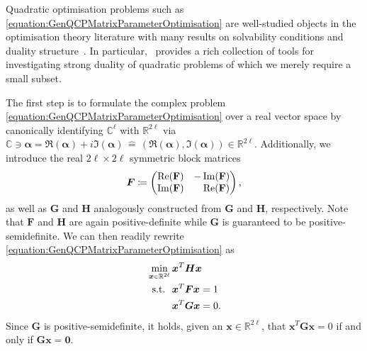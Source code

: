 \documentclass[10pt,conference]{IEEEtran}
\newcommand*{\R}{\mathbb{R}}          %
\newcommand*{\C}{\mathbb{C}}          %
\newcommand*{\transpose}{T}           %
\newcommand*{\deepscriptin}{\raisebox{0.1ex}{$\scriptscriptstyle \in$}}
\newcommand*{\mathhphantomdisplay}[2]{\mathmakebox[\widthof{$\displaystyle #1$}][l]{#2}}
\begin{document}
Quadratic optimisation problems such as \eqref{equation:GenQCPMatrixParameterOptimisation} are well-studied objects in the optimisation theory literature with many results on solvability conditions and duality structure~\cite{Thoai2000DualityBoundMethodForTheGeneralQuadraticProgrammingProblemWithQuadraticConstraints}.
In particular,~\cite{Nguyen2022StrongDualityForGeneralQuadraticProgramsWithQuadraticEqualityConstraints} provides a rich collection of tools for investigating strong duality of quadratic problems of which we merely require a small subset.

The first step is to formulate the complex problem \eqref{equation:GenQCPMatrixParameterOptimisation} over a real vector space by canonically identifying $\C^{\ell}$ with $\R^{2 \ell}$ via $\C \ni \bm{\alpha} = \Re(\bm{\alpha}) + i \Im(\bm{\alpha})\, \widehat{=}\, (\Re(\bm{\alpha}), \Im(\bm{\alpha})) \in \R^{2 \ell}$.
Additionally, we introduce the real $2 \ell \times 2 \ell$ symmetric block matrices
\begin{align}\label{equation:RealSymmetricMatrices}
    \bm{F} \coloneqq \begin{pmatrix}
        \Re(\mathbf{F})& -\Im(\mathbf{F}) \\
        \Im(\mathbf{F})& \hphantom{-}\Re(\mathbf{F})
    \end{pmatrix},
\end{align}
as well as $\bm{G}$ and $\bm{H}$ analogously constructed from $\mathbf{G}$ and $\mathbf{H}$, respectively.
Note that $\bm{F}$ and $\bm{H}$ are again positive-definite while $\bm{G}$ is guaranteed to be positive-semidefinite.
We can then readily rewrite \eqref{equation:GenQCPMatrixParameterOptimisation} as
\begin{align}\label{equation:GenQCPParameterOptimisationReal}
    \begin{split}
        &\min_{\bm{x} \deepscriptin \R^{2 \ell}} \bm{x}^{\transpose} \bm{H} \bm{x} \\
        &\mathhphantomdisplay{\min_{\bm{x} \deepscriptin \R^{2 \ell}}}{\ \, \text{s.t.}}\ \mathhphantomdisplay{\bm{x}^{\transpose} \bm{G} \bm{x}}{\bm{x}^{\transpose} \bm{F} \bm{x}} = 1 \\
        &\hphantom{\min_{\bm{x} \deepscriptin \R^{2 \ell}}}\ \bm{x}^{\transpose} \bm{G} \bm{x} = 0.
    \end{split}
\end{align}
Since $\bm{G}$ is positive-semidefinite, it holds, given an $\bm{x} \in \R^{2 \ell}$, that $\bm{x}^{\transpose} \bm{G} \bm{x} = 0$ if and only if $\bm{G} \bm{x} = \bm{0}$.
\end{document}
